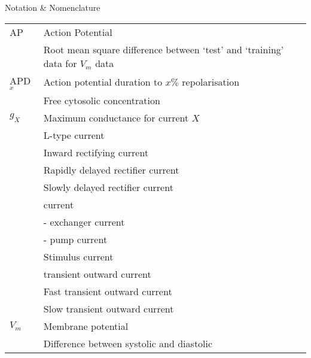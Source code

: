 \documentclass[../thesis-main.tex]{subfiles}
\begin{document}
 {
  \Large\em
  \begin{flushright}
   Notation \& Nomenclature
  \end{flushright}
  \hline
  \vspace*{20mm}
 }
 \label{sec:Notation}
 
 \begin{tabular}{ll}
  AP		& Action Potential \\
  \aprms	& Root mean square difference between `test' and `training' data for $V_m$ data \\
  APD$_x$	& Action potential duration to $x\%$ repolarisation \\
  \cai		& Free cytosolic \ca{} concentration \\
  $g_X$		& Maximum conductance for current $X$ \\
  \ica		& L-type \ca{} current \\
  \ikix		& Inward rectifying \K{} current \\
  \ikr		& Rapidly delayed rectifier \K{} current \\
  \iks		& Slowly delayed rectifier \K{} current \\
  \ina		& \na{} current \\
  \inaca	& \na{}-\ca{} exchanger current \\
  \inak		& \na{}-\K{} pump current \\
  \istim	& Stimulus current \\
  \ito		& \K{} transient outward current \\
  \itof		& Fast \K{} transient outward current \\
  \itos		& Slow \K{} transient outward current \\
  $V_m$		& Membrane potential \\
  \catrans	& Difference between systolic \cai{} and diastolic \cai{} \\
 \end{tabular}
\end{document}
